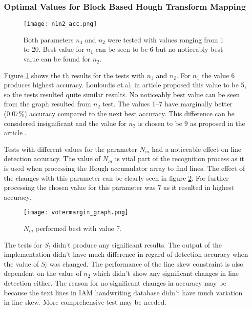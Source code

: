 \documentclass{article}
\begin{document}
    \subsubsection{Optimal Values for Block Based Hough Transform Mapping}
    \begin{figure}[!ht]
      \centering
      \texttt{[image: n1n2\_acc.png]}
      \caption{Both parameters $n_1$ and $n_2$ were tested with values ranging from 1 to 20. Best value for $n_1$ can be seen to be 6 but no noticeably best value can be found for $n_2$.
      \label{fig:n1n2}}
    \end{figure}

    Figure \ref{fig:n1n2} shows the th results for the tests with $n_1$ and $n_2$. For $n_1$ the value 6 produces highest accuracy. Louloudis et.al. in article \cite{Louloudis2} proposed this value to be 5, so the tests resulted quite similar results. No noticeably best value can be seen from the graph resulted from $n_2$ test. The values 1--7 have marginally better (0.07\%) accuracy compared to the next best accuracy. This difference can be considered insignificant and the value for $n_2$ is chosen to be 9 as proposed in the article \cite{Louloudis2}.

    Tests with different values for the parameter $N_m$ had a noticeable effect on line detection accuracy. The value of $N_m$ is vital part of the recognition process as it is used when processing the Hough accumulator array to find lines. The effect of the changes with this parameter can be clearly seen in figure \ref{fig:votermargin}. For further processing the chosen value for this parameter was 7 as it resulted in highest accuracy.

    \begin{figure}[!ht]
      \centering
      \texttt{[image: votermargin\_graph.png]}
      \caption{$N_m$ performed best with value 7.
      \label{fig:votermargin}}
    \end{figure}

    The tests for $S_l$ didn't produce any significant results. The output of the implementation didn't have much difference in regard of detection accuracy when the value of $S_l$ was changed. The performance of the line skew constraint is also dependent on the value of $n_2$ which didn't show any significant changes in line detection either. The reason for no significant changes in accuracy may be because the text lines in IAM handwriting database didn't have much variation in line skew. More comprehensive test may be needed.
\end{document}
